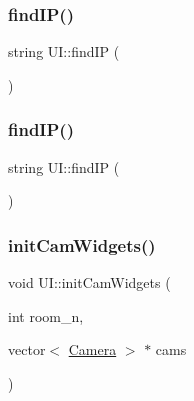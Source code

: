 \subsubsection{\texorpdfstring{find\+I\+P()}{findIP()}\hspace{0.1cm}{\footnotesize\ttfamily [1/2]}}
{\footnotesize\ttfamily string U\+I\+::find\+IP (\begin{DoxyParamCaption}{ }\end{DoxyParamCaption})\hspace{0.3cm}{\ttfamily [private]}}

\mbox{\label{class_u_i_aa7991c3483e84d5ed9f64eeb333c9e44}} 
\subsubsection{\texorpdfstring{find\+I\+P()}{findIP()}\hspace{0.1cm}{\footnotesize\ttfamily [2/2]}}
{\footnotesize\ttfamily string U\+I\+::find\+IP (\begin{DoxyParamCaption}{ }\end{DoxyParamCaption})\hspace{0.3cm}{\ttfamily [private]}}

\mbox{\label{class_u_i_abc8966cc08826d39716b86e0a160af24}} 
\subsubsection{\texorpdfstring{init\+Cam\+Widgets()}{initCamWidgets()}\hspace{0.1cm}{\footnotesize\ttfamily [1/2]}}
{\footnotesize\ttfamily void U\+I\+::init\+Cam\+Widgets (\begin{DoxyParamCaption}\item[{int}]{room\+\_\+n,  }\item[{vector$<$ \hyperlink{struct_camera}{Camera} $>$ $\ast$}]{cams }\end{DoxyParamCaption})\hspace{0.3cm}{\ttfamily [private]}}

